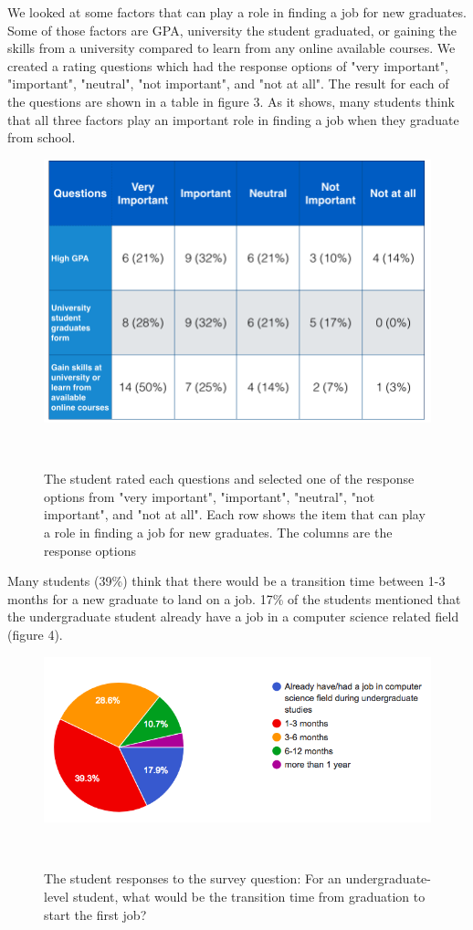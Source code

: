 \documentclass{sigchi}
\begin{document}
We looked at some factors that can play a role in finding a job for new graduates. Some of those factors are GPA, university the student graduated, or gaining the skills from a university compared to learn from any online available courses. We created a rating questions which had the response options of "very important", "important", "neutral", "not important", and "not at all". The result for each of the questions are shown in a table in figure 3. As it shows, many students think that all three factors play an important role in finding a job when they graduate from school.

\begin{figure}
\centering
  \includegraphics[width=1.05\columnwidth]{figures/important_notimportant_table_s}
  \caption{The student rated each questions and selected one of the response options from "very important", "important", "neutral", "not important", and "not at all". Each row shows the item that can play a role in finding a job for new graduates. The columns are the response options}~\label{fig:figure3}
\end{figure}

Many students (39\%) think that there would be a transition time between 1-3 months for a new graduate to land on a job. 17\% of the students mentioned that the undergraduate student already have a job in a computer science related field (figure 4).

\begin{figure}
\centering
  \includegraphics[width=1.05\columnwidth]{figures/transition_time_s}
  \caption{The student responses to the survey question: For an undergraduate-level student, what would be the transition time from graduation to start the first job? }~\label{fig:figure4}
\end{figure}
\end{document}
